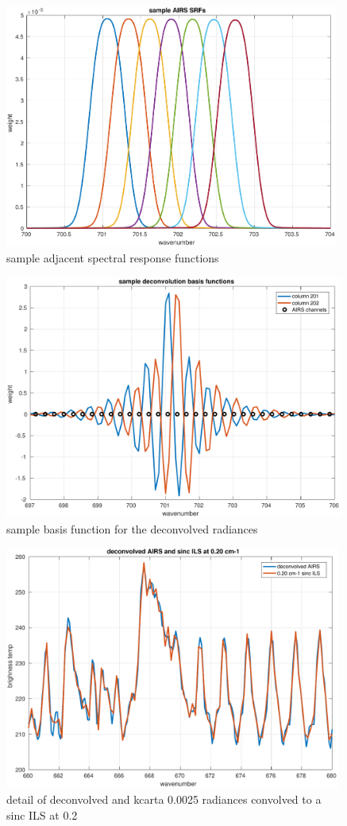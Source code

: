 \documentclass[12pt]{article}
\begin{document}
\begin{figure} %
  \centering
  \includegraphics[height=8cm]{figures/airs_sample_SRFs.pdf}
  \caption{sample adjacent {\airs} spectral response functions}
  \label{srfs1}
\end{figure}

\begin{figure} %
  \centering
  \includegraphics[height=8cm]{figures/airs_decon_basis.pdf}
  \caption{sample basis function for the deconvolved {\airs}
    radiances}
  \label{dbasis}
\end{figure}

\begin{figure} %
  \centering
  \includegraphics[height=8cm]{figures/airs_decon_res.pdf}
  \caption{detail of deconvolved {\airs} and kcarta 0.0025 {\wn}
    radiances convolved to a sinc ILS at 0.2 {\wn}}
  \label{dsinc}
\end{figure}
\end{document}
